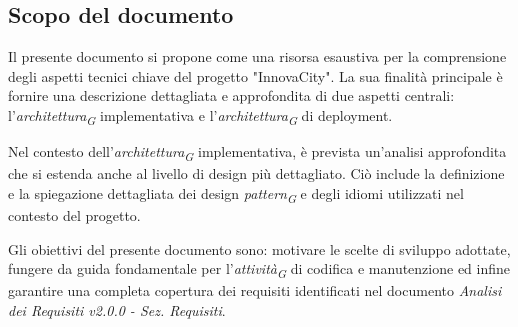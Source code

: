 \subsection{Scopo del documento}
Il presente documento si propone come una risorsa esaustiva per la comprensione degli aspetti tecnici chiave del progetto "InnovaCity". La sua finalità principale è fornire una descrizione dettagliata e approfondita di due aspetti centrali: l'\textit{architettura}\textsubscript{\textit{G}} implementativa e l'\textit{architettura}\textsubscript{\textit{G}} di deployment.

Nel contesto dell'\textit{architettura}\textsubscript{\textit{G}} implementativa, è prevista un'analisi approfondita che si estenda anche al livello di design più dettagliato. Ciò include la definizione e la spiegazione dettagliata dei design \textit{pattern}\textsubscript{\textit{G}} e degli idiomi utilizzati nel contesto del progetto.

Gli obiettivi del presente documento sono: motivare le scelte di sviluppo adottate, fungere da guida fondamentale per l'\textit{attività}\textsubscript{\textit{G}} di codifica e manutenzione ed infine garantire una completa copertura dei requisiti identificati nel documento \textit{Analisi dei Requisiti v2.0.0 - Sez. Requisiti}.